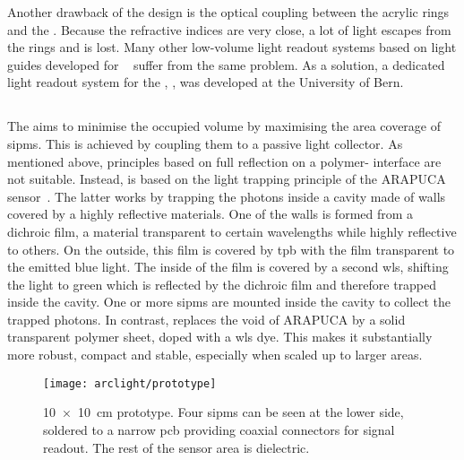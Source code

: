Another drawback of the design is the optical coupling between the acrylic rings and the \lar{}.
Because the refractive indices are very close, a lot of light escapes from the rings and is lost.
Many other low-volume light readout systems based on light guides developed for \lar{}~\cite{lar_lro1, lar_lro2, lar_lro3, lar_lro4, lar_lro5, lar_lro6, lar_lro7} suffer from the same problem.
As a solution, a dedicated light readout system for the \AC{}, \AL{}, was developed at the University of Bern.


\subsection{}
\label{sec:studies_light-col_al}

The \AL{} aims to minimise the occupied volume by maximising the area coverage of \glspl{sipm}.
This is achieved by coupling them to a passive light collector.
As mentioned above, principles based on full reflection on a polymer-\lar{} interface are not suitable.
Instead, \AL{} is based on the light trapping principle of the ARAPUCA sensor~\cite{arapuca}.
The latter works by trapping the photons inside a cavity made of walls covered by a highly reflective materials.
One of the walls is formed from a dichroic film, a material transparent to certain wavelengths while highly reflective to others.
On the outside, this film is covered by \gls{tpb} with the film transparent to the emitted blue light.
The inside of the film is covered by a second \gls{wls}, shifting the light to green which is reflected by the dichroic film and therefore trapped inside the cavity.
One or more \glspl{sipm} are mounted inside the cavity to collect the trapped photons.
In contrast, \AL{} replaces the void of ARAPUCA by a solid transparent polymer sheet, doped with a \gls{wls} dye.
This makes it substantially more robust, compact and stable, especially when scaled up to larger areas.

\begin{figure}[htb]
	\centering
	\texttt{[image: arclight/prototype]}
	\caption{\SI{10 x 10}{\centi\metre} \AL{} prototype.
		Four \glspl{sipm} can be seen at the lower side, soldered to a narrow \gls{pcb} providing coaxial connectors for signal readout.
		The rest of the sensor area is dielectric.}
	\label{fig:arclight_prototype}
\end{figure}

